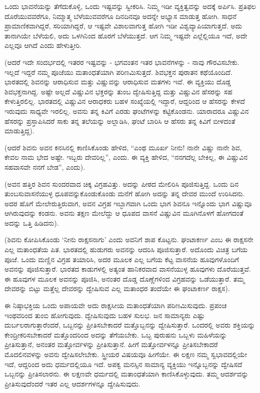 ಒಂದು ಭಾವನೆಯನ್ನು ತೆಗೆದುಕೊಳ್ಳಿ, ಒಂದು ಇಷ್ಟವನ್ನು ಸ್ವೀಕರಿಸಿ. ನಿಮ್ಮ ಇಡೀ ವ್ಯಕ್ತಿತ್ವವನ್ನು ಅದಕ್ಕೆ ಅರ್ಪಿಸಿ. ಪ್ರತಿಫಲ ದೊರೆಯುವವರೆಗೂ, ನಿಮ್ಮಾತ್ಮ ಬೆಳೆಯುವವರೆಗೂ ದಿನದಿನವೂ ಅದನ್ನೇ ಅಭ್ಯಾಸ ಮಾಡುತ್ತ ಹೋಗಿ. ಸಾಧನೆ ಪ್ರಾಮಾಣಿಕವಾಗಿದ್ದರೆ, ಸರಿಯಾಗಿದ್ದರೆ, ಆ ಇಷ್ಟವೇ ವಿಶಾಲವಾಗುತ್ತ ಹೋಗಿ ಇಡೀ ವಿಶ್ವವ್ಯಾಪಿಯಾಗುತ್ತದೆ. ಅದು ತಾನಾಗಿಯೇ ಬೆಳೆಯಲಿ, ಅದು ಒಳಗಿನಿಂದ ಹೊರಗೆ ಬೆಳೆಯುತ್ತದೆ. ಆಗ ನಿಮ್ಮ ಇಷ್ಟವೇ ಎಲ್ಲೆಲ್ಲಿಯೂ ಇದೆ, ಅದೇ ಎಲ್ಲವೂ ಆಗಿದೆ ಎಂದು ಹೇಳುತ್ತೀರಿ.

(ಆದರೆ ಇದೇ ಸಂದರ್ಭದಲ್ಲಿ ಇತರರ ಇಷ್ಟವನ್ನು - ಭಗವಂತನ ಇತರ ಭಾವನೆಗಳನ್ನು - ನಾವು ಗೌರವಿಸಬೇಕು. ಇಲ್ಲದೆ ಇದ್ದರೆ ನಮ್ಮ ಪೂಜೆಯು ಮತಾಂಧತೆಯಾಗಿ ಪರಿಣಮಿಸುತ್ತದೆ. ಶಿವಭಕ್ತನ ಪುರಾತನ ಕಥೆಯೊಂದಿದೆ. ಭಾರತದಲ್ಲಿ ಶಿವನನ್ನು ಆರಾಧಿಸುವ ಮತ್ತು ವಿಷ್ಣುವನ್ನು ಆರಾಧಿಸುವ ಮತಗಳು ಇವೆ. ಈ ವ್ಯಕ್ತಿಯು ದೊಡ್ಡ ಶಿವಭಕ್ತನಾಗಿದ್ದ. ಅಷ್ಟೇ ಅಲ್ಲದೆ ವಿಷ್ಣುವಿನ ಭಕ್ತರನ್ನು ತುಂಬ ದ್ವೇಷಿಸುತ್ತಿದ್ದ ಮತ್ತು ವಿಷ್ಣುವಿನ ಹೆಸರನ್ನು ಸಹ ಕೇಳುತ್ತಿರಲಿಲ್ಲ. ಭಾರತದಲ್ಲಿ ವಿಷ್ಣುವಿನ ಆರಾಧಕರು ಬಹಳ ಸಂಖ್ಯೆಯಲ್ಲಿ ಇದ್ದಾರೆ, ಆದ್ದರಿಂದ ಆ ಹೆಸರನ್ನು ಕೇಳದೆ ಇರುವುದು ಸಾಧ್ಯವೇ ಇರಲಿಲ್ಲ. ಅವನು ತನ್ನ ಕಿವಿಗೆ ಎರಡು ಘಂಟೆಗಳನ್ನು ಕಟ್ಟಿಕೊಂಡನು. ಯಾರಾದರೂ ವಿಷ್ಣುವಿನ ಹೆಸರನ್ನು ಪ್ರಸ್ತಾಪಿಸಿದರೆ ಸಾಕು ತನ್ನ ತಲೆಯನ್ನು ಅಲ್ಲಾಡಿಸಿ, ಘಂಟೆ ಬಾರಿಸಿ ಆ ಹೆಸರು ತನ್ನ ಕಿವಿಗೆ ಬೀಳದಂತೆ ಮಾಡುತ್ತಿದ್ದ).

(ಆದರೆ ಶಿವನು ಅವನ ಕನಸಿನಲ್ಲಿ ಕಾಣಿಸಿಕೊಂಡು ಹೇಳಿದ, “ಎಂಥ ಮೂರ್ಖ ನೀನು! ನಾನೇ ವಿಷ್ಣು ನಾನೇ ಶಿವ, ಕೇವಲ ನಾಮ ಭೇದ ಅಷ್ಟೇ. ಇಬ್ಬರು ದೇವರಿಲ್ಲ”, ಎಂದು. ಈ ವ್ಯಕ್ತಿ ಹೇಳಿದ, “ನನಗದೆಲ್ಲ ಬೇಕಿಲ್ಲ, ಈ ವಿಷ್ಣುವಿನ ಸಹವಾಸವೇ ನನಗೆ ಬೇಡ”, ಎಂದು).

(ಅವನ ಹತ್ತಿರ ಶಿವನ ಸುಂದರವಾದ ಚಿಕ್ಕ ವಿಗ್ರಹವಿತ್ತು. ಅದನ್ನು ಪೀಠದ ಮೇಲಿರಿಸಿ ಪೂಜಿಸುತ್ತಿದ್ದ. ಒಂದು ದಿನ ತುಂಬಸುವಾಸನೆಯುಳ್ಳ ಧೂಪವನ್ನುಕೊಂಡುಕೊಂಡು ಮನೆಗೆ ಹೋಗಿ ಅದನ್ನು ತನ್ನ ದೇವರ ಮುಂದೆ ಉರಿಸಿದನು. ಅದರ ಹೊಗೆ ಮೇಲೇರುತ್ತಿರುವಾಗ, ಅವನ ವಿಗ್ರಹ ಇಬ್ಭಾಗವಾಗಿ ಒಂದು ಭಾಗ ಶಿವನೂ ಇನ್ನೊಂದು ಭಾಗ ವಿಷ್ಣುವೂ ಆಗಿರುವುದನ್ನು ಕಂಡನು. ಅವನು ತಕ್ಷಣ ಮೇಲೆದ್ದು ಆ ಧೂಪದ ವಾಸನೆ ವಿಷ್ಣುವಿನ ಮೂಗಿನೊಳಗೆ ಹೋಗದಂತೆ ಅದನ್ನು ಒತ್ತಿ ಹಿಡಿದನು).

(ಶಿವನು ಕೋಪಿಸಿಕೊಂಡು ‘ನೀನು ರಾಕ್ಷಸನಾಗು’ ಎಂದು ಅವನಿಗೆ ಶಾಪ ಕೊಟ್ಟನು. ಘಂಟಾಕರ್ಣ ಎಂಬ ಈ ರಾಕ್ಷಸನೇ ಎಲ್ಲ ಮತಾಂಧತೆಯ ಪಿತ. ಭಾರತದಲ್ಲಿ ಹುಡುಗರು ಅವನನ್ನು ಆದರಿಸಿ ಪೂಜಿಸುತ್ತಾರೆ. ಅದೊಂದು ವಿಚಿತ್ರ ಬಗೆಯ ಪೂಜೆ. ಒಂದು ಮಣ್ಣಿನ ವಿಗ್ರಹ ತಯಾರಿಸಿ, ಅದರ ಮೂಲಕ ಎಲ್ಲ ಬಗೆಯ ಕೆಟ್ಟ ವಾಸನೆಯ ಹೂವುಗಳೊಂದಿಗೆ ಅವನನ್ನು ಪೂಜಿಸುತ್ತಾರೆ. ಭಾರತದ ಕಾಡುಗಳಲ್ಲಿ ಅತ್ಯಂತ ಹಾನಿಕರವಾದ ವಾಸನೆಯುಳ್ಳ ಹೂವುಗಳು ದೊರೆಯುತ್ತವೆ. ಈ ಹೂವುಗಳ ಮೂಲಕ ಅವನನ್ನು ಪೂಜಿಸಿ, ಅನಂತರ ದೊಡ್ಡ ದೊಣ್ಣೆಗಳಿಂದ ವಿಗ್ರಹವನ್ನು ಒಡೆಯುತ್ತಾರೆ. ತಮ್ಮ ದೇವರನ್ನು ಬಿಟ್ಟು ಮತ್ತೆಲ್ಲ ದೇವರನ್ನು ದ್ವೇಷಿಸುವ ಎಲ್ಲ ಮತಾಂಧರ ತಂದೆಯೇ ಈ ಘಂಟಾಕರ್ಣ ರಾಕ್ಷಸ).

ಈ ನಿಷ್ಠಾಭಕ್ತಿಯ ಒಂದು ಅಪಾಯವೇ ಅದು ರಾಕ್ಷಸೀಯ ಮತಾಂಧತೆಯಾಗಿ ಪರಿಣಮಿಸುವುದು. ಪ್ರಪಂಚ ಇಂಥವರಿಂದ ತುಂಬಿ ಹೋಗುವುದು. ದ್ವೇಷಿಸುವುದು ಬಹಳ ಸುಲಭ. ಜನ ಸಾಮಾನ್ಯರು ಎಷ್ಟು ದುರ್ಬಲರಾಗುತ್ತಾರೆಂದರೆ, ಒಬ್ಬನನ್ನು ಪ್ರೀತಿಸಬೇಕಾದರೆ ಮತ್ತೊಬ್ಬನನ್ನು ದ್ವೇಷಿಸುತ್ತಾರೆ. ಒಂದರಲ್ಲಿ ಅವರು ಶಕ್ತಿಯನ್ನು ಕೇಂದ್ರೀಕರಿಸಬೇಕಾದರೆ ಮತ್ತೊಂದರಿಂದ ಅದನ್ನು ತೆಗೆಯಬೇಕು. ಒಬ್ಬ ಪುರುಷನು ಒಬ್ಬಳು ಮಹಿಳೆಯನ್ನು ಪ್ರೀತಿಸುತ್ತಾನೆ, ಅನಂತರ ಮತ್ತೋರ್ವಳನ್ನು ಪ್ರೀತಿಸುತ್ತಾನೆ. ಹೀಗೆ ಮತ್ತೋರ್ವಳನ್ನೂ ಪ್ರೀತಿಸಬೇಕಾದರೆ ಮೊದಲಿನವಳನ್ನು ಅವನು ದ್ವೇಷಿಸಲೇಬೇಕು. ಸ್ತ್ರೀಯರ ವಿಷಯವೂ ಹೀಗೆಯೇ. ಈ ಲಕ್ಷಣ ನಮ್ಮ ಸ್ವಭಾವದಲ್ಲಿಯೇ ಇದೆ, ಆದ್ದರಿಂದ ಅದು ಧರ್ಮದಲ್ಲಿಯೂ ಇದೆ. ಅಪಕ್ವ ಮನಸ್ಸಿನ ಸಾಮಾನ್ಯ ವ್ಯಕ್ತಿಯು ಇನ್ನೊಬ್ಬನನ್ನು ದ್ವೇಷಿಸದೆ ಒಬ್ಬನನ್ನು ಪ್ರೀತಿಸಲಾರನು. ಈ ಲಕ್ಷಣವೇ ಧರ್ಮದಲ್ಲಿ ಮತಾಂಧತೆಯಾಗಿ ಕಾಣಿಸಿಕೊಳ್ಳುವುದು. ತಮ್ಮ ಆದರ್ಶವನ್ನು ಪ್ರೀತಿಸುವುದೆಂದರೆ ಇತರ ಎಲ್ಲ ಆದರ್ಶಗಳನ್ನೂ ದ್ವೇಷಿಸುವುದು.

